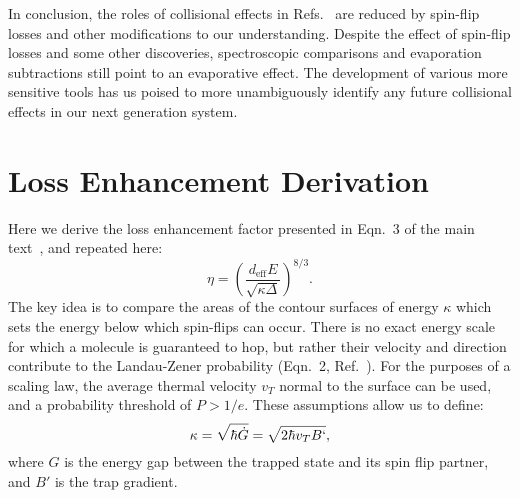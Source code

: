 \documentclass[%
 reprint,
 amsmath,amssymb,
 aps,
pra,
]{revtex4-1}
\begin{document}

In conclusion, the roles of collisional effects in Refs.~\cite{Stuhl2013,Stuhl2012evap} are reduced by spin-flip losses and other modifications to our understanding.
Despite the effect of spin-flip losses and some other discoveries, spectroscopic comparisons and evaporation subtractions still point to an evaporative effect. 
The development of various more sensitive tools has us poised to more unambiguously identify any future collisional effects in our next generation system.

\section{Loss Enhancement Derivation}

Here we derive the loss enhancement factor presented in Eqn.~3 of the main text~\cite{smt}, and repeated here:
\begin{equation}
\eta= \left(\frac{d_\text{eff}E}{\sqrt{\kappa\Delta}}\right)^{8/3}.
\end{equation}
The key idea is to compare the areas of the contour surfaces of energy $\kappa$ which sets the energy below which spin-flips can occur.
There is no exact energy scale for which a molecule is guaranteed to hop, but rather their velocity and direction contribute to the Landau-Zener probability (Eqn.~2, Ref.~\cite{smt}).
For the purposes of a scaling law, the average thermal velocity $v_T$ normal to the surface can be used, and a probability threshold of $P>1/e$.
These assumptions allow us to define: 
\begin{equation}
\kappa=\sqrt{\hbar\dot{G}}=\sqrt{2\hbar v_T B`},
\end{equation} 
where $G$ is the energy gap between the trapped state and its spin flip partner, and $B'$ is the trap gradient.
\end{document}
